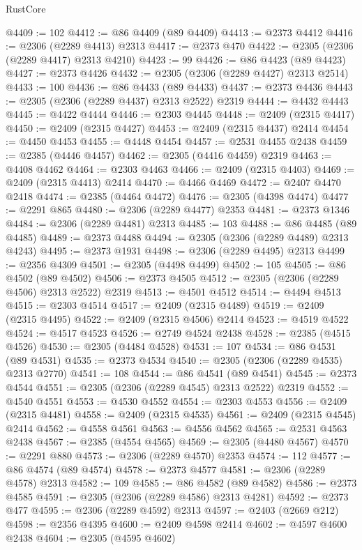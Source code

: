 \begin{lexlean}{RustCore}
\begin{coremodule}
@4409 := 102
@4412 := @86 @4409 (@89 @4409)
@4413 := @2373 @4412
@4416 := @2306 (@2289 @4413) @2313
@4417 := @2373 @470
@4422 := @2305 (@2306 (@2289 @4417) @2313 @4210)
@4423 := 99
@4426 := @86 @4423 (@89 @4423)
@4427 := @2373 @4426
@4432 := @2305 (@2306 (@2289 @4427) @2313 @2514)
@4433 := 100
@4436 := @86 @4433 (@89 @4433)
@4437 := @2373 @4436
@4443 := @2305 (@2306 (@2289 @4437) @2313 @2522) @2319
@4444 := @4432 @4443
@4445 := @4422 @4444
@4446 := @2303 @4445
@4448 := @2409 (@2315 @4417)
@4450 := @2409 (@2315 @4427)
@4453 := @2409 (@2315 @4437) @2414
@4454 := @4450 @4453
@4455 := @4448 @4454
@4457 := @2531 @4455 @2438
@4459 := @2385 (@4446 @4457)
@4462 := @2305 (@4416 @4459) @2319
@4463 := @4408 @4462
@4464 := @2303 @4463
@4466 := @2409 (@2315 @4403)
@4469 := @2409 (@2315 @4413) @2414
@4470 := @4466 @4469
@4472 := @2407 @4470 @2418
@4474 := @2385 (@4464 @4472)
@4476 := @2305 (@4398 @4474)
@4477 := @2291 @865
@4480 := @2306 (@2289 @4477) @2353
@4481 := @2373 @1346
@4484 := @2306 (@2289 @4481) @2313
@4485 := 103
@4488 := @86 @4485 (@89 @4485)
@4489 := @2373 @4488
@4494 := @2305 (@2306 (@2289 @4489) @2313 @4243)
@4495 := @2373 @1931
@4498 := @2306 (@2289 @4495) @2313
@4499 := @2356 @4309
@4501 := @2305 (@4498 @4499)
@4502 := 105
@4505 := @86 @4502 (@89 @4502)
@4506 := @2373 @4505
@4512 := @2305 (@2306 (@2289 @4506) @2313 @2522) @2319
@4513 := @4501 @4512
@4514 := @4494 @4513
@4515 := @2303 @4514
@4517 := @2409 (@2315 @4489)
@4519 := @2409 (@2315 @4495)
@4522 := @2409 (@2315 @4506) @2414
@4523 := @4519 @4522
@4524 := @4517 @4523
@4526 := @2749 @4524 @2438
@4528 := @2385 (@4515 @4526)
@4530 := @2305 (@4484 @4528)
@4531 := 107
@4534 := @86 @4531 (@89 @4531)
@4535 := @2373 @4534
@4540 := @2305 (@2306 (@2289 @4535) @2313 @2770)
@4541 := 108
@4544 := @86 @4541 (@89 @4541)
@4545 := @2373 @4544
@4551 := @2305 (@2306 (@2289 @4545) @2313 @2522) @2319
@4552 := @4540 @4551
@4553 := @4530 @4552
@4554 := @2303 @4553
@4556 := @2409 (@2315 @4481)
@4558 := @2409 (@2315 @4535)
@4561 := @2409 (@2315 @4545) @2414
@4562 := @4558 @4561
@4563 := @4556 @4562
@4565 := @2531 @4563 @2438
@4567 := @2385 (@4554 @4565)
@4569 := @2305 (@4480 @4567)
@4570 := @2291 @880
@4573 := @2306 (@2289 @4570) @2353
@4574 := 112
@4577 := @86 @4574 (@89 @4574)
@4578 := @2373 @4577
@4581 := @2306 (@2289 @4578) @2313
@4582 := 109
@4585 := @86 @4582 (@89 @4582)
@4586 := @2373 @4585
@4591 := @2305 (@2306 (@2289 @4586) @2313 @4281)
@4592 := @2373 @477
@4595 := @2306 (@2289 @4592) @2313
@4597 := @2403 (@2669 @212)
@4598 := @2356 @4395
@4600 := @2409 @4598 @2414
@4602 := @4597 @4600 @2438
@4604 := @2305 (@4595 @4602)

\end{coremodule}
\end{lexlean}
